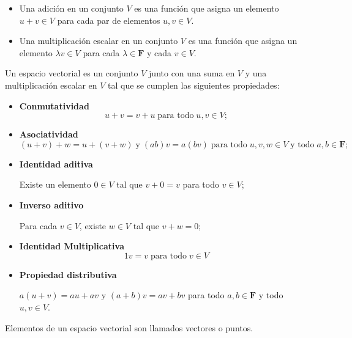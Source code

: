     \begin{mydef}\hfill
	\begin{itemize}
	    \item Una adición en un conjunto $V$ es una función que asigna un elemento $u+v\in V$ para cada par de elementos $u,v\in V$.
	    \item Una multiplicación escalar en un conjunto $V$ es una función que asigna un elemento $\lambda  v\in V$ para cada $\lambda \in \textbf{F}$ y cada $v\in V$.
	\end{itemize}
    \end{mydef}

    \begin{mydef}\hfill 
	Un espacio vectorial es un conjunto $V$ junto con una suma en $V$ y una multiplicación escalar en $V$ tal que se cumplen las siguientes propiedades: 
	\begin{itemize}
	    \item \textbf{Conmutatividad}
		$$u+v=v+u\; \mbox{para todo}\; u,v\in V;$$
	    \item \textbf{Asociatividad}
		$$(u+v)+w=u+(v+w)\; \mbox{y}\; (ab)v=a(bv)\; \mbox{para todo}\; u,v,w \in V\; \mbox{y todo}\; a,b\in \textbf{F};$$
	    \item \textbf{Identidad aditiva}
		\begin{center}
		    Existe un elemento $0\in V$ tal que $v+0=v$ para todo $v\in V$;
		\end{center}

	    \item \textbf{Inverso aditivo}
		\begin{center}
		    Para cada $v\in V$, existe $w \in V$ tal que $v+w=0$;
		\end{center}

	    \item \textbf{Identidad Multiplicativa}
		$$1v=v\; \mbox{para todo}\; v\in V$$

	    \item \textbf{Propiedad distributiva}
		\begin{center}
		    $a(u+v)=au+av$ y $(a+b)v=av+bv$ para todo $a,b\in \textbf{F}$ y todo $u,v \in V$.
		\end{center}
	\end{itemize}
    \end{mydef}

    \begin{mydef}
	Elementos de un espacio vectorial son llamados vectores o puntos.
    \end{mydef}

